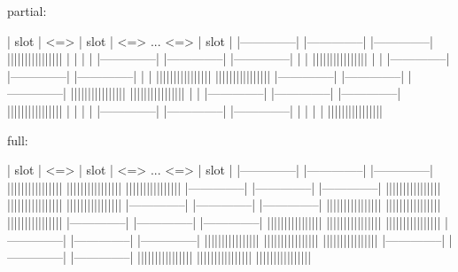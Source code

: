 \begin{DoxyPre}partial:\end{DoxyPre}



\begin{DoxyPre}


|     slot     | <=> |     slot     | <=> ... <=> |     slot     |
|--------------|     |--------------|             |--------------|
||||||||||||||||     |              |             |              |
|--------------|     |--------------|             |--------------|
|              |     ||||||||||||||||             |              |
|--------------|     |--------------|             |--------------|
|              |     ||||||||||||||||             ||||||||||||||||
|--------------|     |--------------|             |--------------|
||||||||||||||||     ||||||||||||||||             |              |
|--------------|     |--------------|             |--------------|
||||||||||||||||     |              |             |              |
|--------------|     |--------------|             |--------------|
|              |     |              |             ||||||||||||||||


\end{DoxyPre}



\begin{DoxyPre}full:\end{DoxyPre}



\begin{DoxyPre}


|     slot     | <=> |     slot     | <=> ... <=> |     slot     |
|--------------|     |--------------|             |--------------|
||||||||||||||||     ||||||||||||||||             ||||||||||||||||
|--------------|     |--------------|             |--------------|
||||||||||||||||     ||||||||||||||||             ||||||||||||||||
|--------------|     |--------------|             |--------------|
||||||||||||||||     ||||||||||||||||             ||||||||||||||||
|--------------|     |--------------|             |--------------|
||||||||||||||||     ||||||||||||||||             ||||||||||||||||
|--------------|     |--------------|             |--------------|
||||||||||||||||     ||||||||||||||||             ||||||||||||||||
|--------------|     |--------------|             |--------------|
||||||||||||||||     ||||||||||||||||             ||||||||||||||||


\end{DoxyPre}



